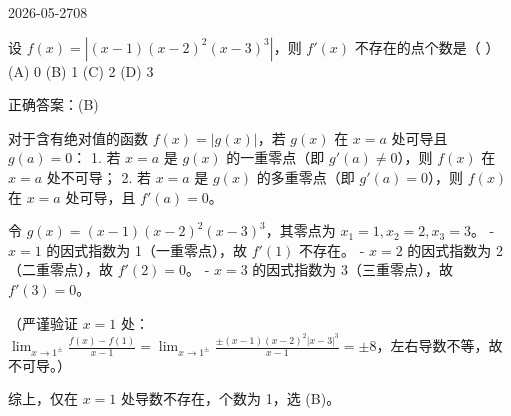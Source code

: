 \begin{mistake}{2026-05-27}{08}

\begin{problemcontent}
设 \(f(x) = |(x-1)(x-2)^2(x-3)^3|\)，则 \(f'(x)\) 不存在的点个数是（ \quad ）
(A) 0 
(B) 1 
(C) 2 
(D) 3
\end{problemcontent}

\begin{solutioncontent}
正确答案：(B)

对于含有绝对值的函数 \(f(x) = |g(x)|\)，若 \(g(x)\) 在 \(x=a\) 处可导且 \(g(a)=0\)：
1. 若 \(x=a\) 是 \(g(x)\) 的一重零点（即 \(g'(a) \neq 0\)），则 \(f(x)\) 在 \(x=a\) 处不可导；
2. 若 \(x=a\) 是 \(g(x)\) 的多重零点（即 \(g'(a) = 0\)），则 \(f(x)\) 在 \(x=a\) 处可导，且 \(f'(a) = 0\)。

令 \(g(x) = (x-1)(x-2)^2(x-3)^3\)，其零点为 \(x_1=1, x_2=2, x_3=3\)。
- \(x=1\) 的因式指数为 1（一重零点），故 \(f'(1)\) 不存在。
- \(x=2\) 的因式指数为 2（二重零点），故 \(f'(2)=0\)。
- \(x=3\) 的因式指数为 3（三重零点），故 \(f'(3)=0\)。

（严谨验证 \(x=1\) 处：\(\lim_{x \to 1^\pm} \frac{f(x)-f(1)}{x-1} = \lim_{x \to 1^\pm} \frac{\pm(x-1)(x-2)^2|x-3|^3}{x-1} = \pm 8\)，左右导数不等，故不可导。）

综上，仅在 \(x=1\) 处导数不存在，个数为 1，选 (B)。
\end{solutioncontent}


\end{mistake}
